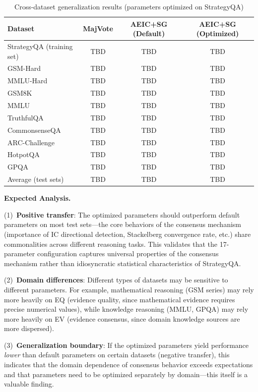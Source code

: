 \documentclass[12pt,a4paper]{article}
\begin{document}
\begin{table}[H]
\centering
\caption{Cross-dataset generalization results (parameters optimized on StrategyQA)}\label{tab:exp5_result}
\begin{tabular}{lccc}
\toprule
Dataset & MajVote & AEIC+SG (Default) & AEIC+SG (Optimized) \\
\midrule
StrategyQA (training set) & TBD & TBD & TBD \\
\midrule
GSM-Hard & TBD & TBD & TBD \\
MMLU-Hard & TBD & TBD & TBD \\
GSM8K & TBD & TBD & TBD \\
MMLU & TBD & TBD & TBD \\
TruthfulQA & TBD & TBD & TBD \\
CommonsenseQA & TBD & TBD & TBD \\
ARC-Challenge & TBD & TBD & TBD \\
HotpotQA & TBD & TBD & TBD \\
GPQA & TBD & TBD & TBD \\
\midrule
Average (test sets) & TBD & TBD & TBD \\
\bottomrule
\end{tabular}
\end{table}

\textbf{Expected Analysis.}

(1)~\textbf{Positive transfer}: The optimized parameters should outperform default parameters on most test sets---the core behaviors of the consensus mechanism (importance of IC directional detection, Stackelberg convergence rate, etc.) share commonalities across different reasoning tasks. This validates that the 17-parameter configuration captures universal properties of the consensus mechanism rather than idiosyncratic statistical characteristics of StrategyQA.

(2)~\textbf{Domain differences}: Different types of datasets may be sensitive to different parameters. For example, mathematical reasoning (GSM series) may rely more heavily on EQ (evidence quality, since mathematical evidence requires precise numerical values), while knowledge reasoning (MMLU, GPQA) may rely more heavily on EV (evidence consensus, since domain knowledge sources are more dispersed).

(3)~\textbf{Generalization boundary}: If the optimized parameters yield performance \textit{lower} than default parameters on certain datasets (negative transfer), this indicates that the domain dependence of consensus behavior exceeds expectations and that parameters need to be optimized separately by domain---this itself is a valuable finding.
\end{document}
